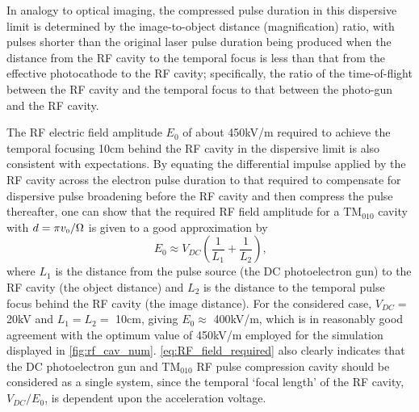 In analogy to optical imaging, the compressed pulse duration in this dispersive limit is determined by the image-to-object distance (magnification) ratio, with pulses shorter than the original laser pulse duration being produced when the distance from the RF cavity to the temporal focus is less than that from the effective photocathode to the RF cavity; specifically, the ratio of the time-of-flight between the RF cavity and the temporal focus to that between the photo-gun and the RF cavity.

The RF electric field amplitude $E_{0}$ of about 450kV/m required to achieve the temporal focusing 10cm behind the RF cavity in the dispersive limit is also consistent with expectations.
By equating the differential impulse applied by the RF cavity across the electron pulse duration to that required to compensate for dispersive pulse broadening before the RF cavity and then compress the pulse thereafter, one can show that the required RF field amplitude for a $\text{TM}_{010}$ cavity with $ d = \pi v_{{\scriptscriptstyle 0}} / \Omega $ is given to a good approximation by
\begin{equation} \label{eq:RF_field_required}
  E_{0} \approx V_{DC} \left ( \frac{1}{ L_{1} } + \frac{1}{ L_{2} } \right ) \text{,}
\end{equation}
where $L_{1}$ is the distance from the pulse source (the DC photoelectron gun) to the RF cavity (the object distance) and $L_{2}$ is the distance to the temporal pulse focus behind the RF cavity (the image distance).
For the considered case, $V_{DC} = $ 20kV and $ L_{1} = L_{2} = $ 10cm, giving $ E_{0} \approx $ 400kV/m, which is in reasonably good agreement with the optimum value of 450kV/m employed for the simulation displayed in \ref{fig:rf_cav_num}.
\ref{eq:RF_field_required} also clearly indicates that the DC photoelectron gun and $\text{TM}_{010}$ RF pulse compression cavity should be considered as a single system, since the temporal `focal length' of the RF cavity, $ V_{DC} / E_{0} $, is dependent upon the acceleration voltage.

